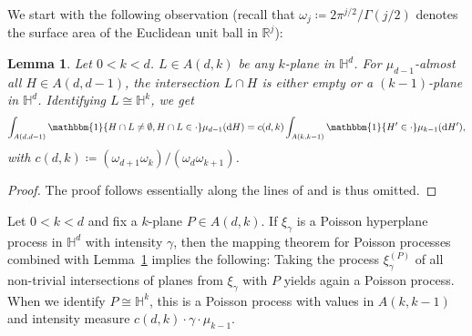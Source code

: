 \documentclass[12pt,a4paper]{article}
\newtheorem{lemma}[proposition]{Lemma}
\theoremstyle{definition}
\renewcommand{\H}{\mathbb{H}}
\newcommand{\R}{\mathbb{R}}
\newcommand{\dint}{{\rm d}}
\newcommand{\one}{\mathbbm{1}}
\begin{document}
We start with the following observation (recall that $\omega_j \coloneqq 2\pi^{j/2}/\Gamma(j/2)$ denotes the surface area of the Euclidean unit ball in $\R^j$):
\begin{lemma} \label{lem:IntersecionIntensity}
    Let $0<k<d$.
    $L \in A(d,k)$ be any $k$-plane in $\H^d$.
    For $\mu_{d-1}$-almost all $H \in A(d,d-1)$, the intersection $L \cap H$ is either empty or a $(k-1)$-plane in $\H^d$.
    Identifying $L \cong \H^k$, we get
    \begin{equation*}
        \int_{A(d,d-1)} \one\{H\cap L \neq \emptyset,H \cap L \in \cdot\} \mu_{d-1}(\dint H)
        = c(d,k) \int_{A(k,k-1)} \one\{H' \in \cdot\} \mu_{k-1}(\dint H'),
    \end{equation*}
    with $c(d,k) \coloneqq ({\omega_{d+1}\omega_{k}})/({\omega_{d}\omega_{k+1}})$.
\end{lemma}
\begin{proof}
    The proof follows essentially along the lines of \cite[Lemma 2.2 \& Lemma 2.3]{BHT23} and is thus omitted.
\end{proof}
    



Let $0<k<d$ and fix a $k$-plane $P \in A(d,k)$.
If $\xi_\gamma$ is a Poisson hyperplane process in $\H^d$ with intensity $\gamma$, then the mapping theorem for Poisson processes combined with Lemma~\ref{lem:IntersecionIntensity} implies the following:
Taking the process $\xi_\gamma^{(P)}$ of all non-trivial intersections of planes from $\xi_\gamma$ with $P$ yields again a Poisson process.
When we identify $P \cong \H^k$, this is a Poisson process with values in $A(k,k-1)$ and intensity measure $c(d,k)\cdot\gamma\cdot\mu_{k-1}$.
\end{document}
